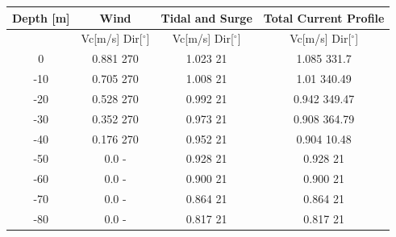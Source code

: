 \begin{table} [H]
\centering
\begin{tabular}{ |c|c|c|c|}
\hline
Depth [m] & Wind & Tidal and Surge & Total Current Profile \\
 \hline
 \hline
 & Vc[m/s] \hspace{0.3cm} Dir[$^{\circ}$] &  Vc[m/s] \hspace{0.3cm} Dir[$^{\circ}$] & Vc[m/s] \hspace{0.3cm} Dir[$^{\circ}$] \\
 \hline
 0 & 0.881 \hspace{0.7cm} 270 & 1.023 \hspace{0.7cm} 21  & 1.085 \hspace{0.7cm} 331.7 \\
 -10 & 0.705 \hspace{0.7cm} 270 & 1.008 \hspace{0.7cm} 21  & 1.01 \hspace{0.7cm} 340.49 \\
 -20 & 0.528 \hspace{0.7cm} 270 & 0.992 \hspace{0.7cm} 21  & 0.942
 \hspace{0.7cm} 349.47 \\
 -30 & 0.352 \hspace{0.7cm} 270 & 0.973 \hspace{0.7cm} 21  & 0.908 \hspace{0.7cm} 364.79 \\
 -40 & 0.176 \hspace{0.7cm} 270 & 0.952 \hspace{0.7cm} 21  & 0.904 \hspace{0.7cm} 10.48 \\
 -50 & 0.0 \hspace{0.7cm} - & 0.928 \hspace{0.7cm} 21  & 0.928 \hspace{1.15cm} 21 \\
  -60 & 0.0 \hspace{0.7cm} - & 0.900 \hspace{0.7cm} 21  & 0.900 \hspace{1.15cm} 21 \\
 -70 & 0.0 \hspace{0.7cm} - & 0.864 \hspace{0.7cm} 21  & 0.864 \hspace{1.15cm} 21 \\
  -80 & 0.0 \hspace{0.7cm} - & 0.817 \hspace{0.7cm} 21  & 0.817 \hspace{1.15cm} 21 \\

\end{tabular}
\end{table}
